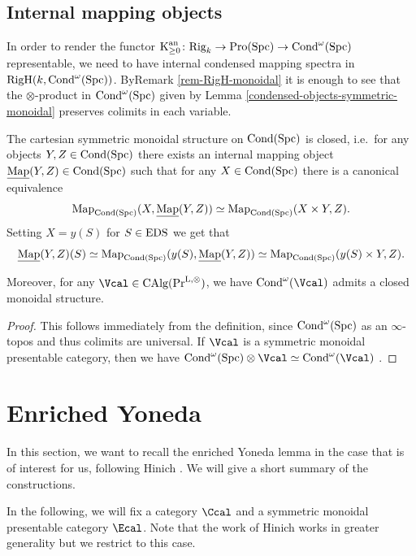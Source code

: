\documentclass[colorinlistoftodos,article,11pt,reqno]{article}
\newcommand{\RigH}{\textup{RigH}}
\newcommand{\Rig}{\textup{Rig}}
\newcommand{\Pro}{\textup{Pro}}
\newcommand{\Cond}{\textup{Cond}}
\newcommand{\Spc}{\textup{Spc}}
\newcommand{\EDS}{\textup{EDS}}
\newcommand{\K}{\textup{K}}
\newcommand{\Kan}{\K^\textup{an}}
\newcommand{\Map}{\textup{Map}}
\newcommand{\Mapu}{\underline{\Map}}
\renewcommand{\to}[1][]{\overset{#1}{\rightarrow}}
\newcommand{\PrLO}{\textup{Pr}^{\textup{L},\otimes}}
\newcommand{\CAlgPr}{\textup{CAlg}(\PrLO)}
\begin{document}
\begin{appendix}
\subsection*{Internal mapping objects}

In order to render the functor $\Kan_{\geq 0} \colon \Rig_k \to \Pro(\Spc) \to \Cond^{\omega}(\Spc)$ representable, we need to have internal condensed mapping spectra in $\RigH(k,\Cond^{\omega}(\Spc))$. ByRemark \ref{rem-RigH-monoidal} it is enough to see that the $\otimes$-product in $\Cond^{\omega}(\Spc)$ given by Lemma \ref{condensed-objects-symmetric-monoidal} preserves colimits in each variable. 

\begin{lem}
    The cartesian symmetric monoidal structure on $\Cond(\Spc)$ is closed, i.e.\ for any objects $Y,Z\in\Cond(\Spc)$ there exists an internal mapping object $\Mapu(Y,Z)\in\Cond(\Spc)$ such that for any $X\in\Cond(\Spc)$ there is a canonical equivalence 
\[
\Map_{\Cond(\Spc)}(X,\Mapu(Y,Z)) \simeq \Map_{\Cond(\Spc)}(X\times Y,Z).
\]
Setting $X=y(S)$ for $S\in\EDS$ we get that
\[
\Mapu(Y,Z)(S) \simeq \Map_{\Cond(\Spc)}(y(S),\Mapu(Y,Z)) \simeq \Map_{\Cond(\Spc)}(y(S)\times Y,Z).
\]

Moreover, for any $\Vcal\in \CAlgPr$, we have $\Cond^{\omega}(\Vcal)$ admits a closed monoidal structure.
\end{lem}
\begin{proof}
    This follows immediately from the definition, since $\Cond^{\omega}(\Spc)$ as an $\infty$-topos and thus colimits are universal. If $\Vcal$ is a symmetric monoidal presentable category, then we have $\Cond^{\omega}(\Spc)\otimes \Vcal\simeq \Cond^{\omega}(\Vcal)$ \cite[Prop. 2.4]{DrewMHM}.
\end{proof}



\section{Enriched Yoneda}
\label{app.yoneda}

In this section, we want to recall the enriched Yoneda lemma in the case that is of interest for us, following Hinich \cite{Hinich}. We will give a short summary of the constructions.

In the following, we will fix a category $\Ccal$ and a symmetric monoidal presentable category $\Ecal$. Note that the work of Hinich works in greater generality but we restrict to this case.


\end{appendix}
\end{document}
